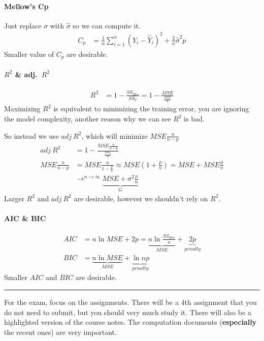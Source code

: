 \documentclass[12 pt]{article}
\begin{document}
  \paragraph{Mellow's Cp} Just replace $\sigma$ with $\hat{\sigma}$ so we can compute it.
  \begin{align*}
    C_p & = \frac{1}{n} \sum_{i=1}^n (Y_i - \hat{Y}_i)^2 + \frac{2}{n} \hat{\sigma}^2 p
  \end{align*}
  Smaller value of $C_p$ are desirable.
  \paragraph{$R^2$ \& adj.\ $R^2$}
  \begin{align*}
    R^2 & = 1 - \frac{SS_{Res}}{SS_T} = 1 - \frac{MSE}{\frac{SST}{n}}
  \end{align*}
  Maximizing $R^2$ is equivalent to minimizing the training error, you are ignoring the model complexity, another reason why we can see $R^2$ is bad.

  So instead we use $adj\ R^2$, which will minimize $MSE \frac{n}{n-p}$
  \begin{align*}
    adj\ R^2 & = 1 - \frac{MSE \frac{n}{n-p}}{\frac{SS_T}{n}}
    \\ MSE \frac{n}{n-p} & = MSE \frac{n}{1 - \frac{p}{n}} \approx MSE \left(1 + \frac{p}{n}\right) = MSE + MSE \frac{p}{n}
                           \\ & \to^{n \to \infty} \underbrace{MSE + \sigma^2 \frac{p}{n}}_{G}
  \end{align*}
  Larger $R^2$ and $adj\ R^2$ are desirable, however we shouldn't rely on $R^2$.
  \paragraph{AIC \& BIC}
  \begin{align*}
    AIC & = n \ln MSE + 2 p = \underbrace{n \ln \frac{SS_{Res}}{n}}_{MSE} + \underbrace{2p}_{penalty}
    \\ BIC & = \underbrace{n \ln MSE}_{MSE} + \underbrace{\ln n p}_{penalty}
  \end{align*}
  Smaller $AIC$ and $BIC$ are desirable.  \\ \noindent
  \rule{\textwidth}{0.5pt}
  For the exam, focus on the
  assignments. There will be a 4th assignment that you do not need to
  submit, but you should very much study it. There will also be a
  highlighted version of the course notes. The computation documents
  (\textbf{especially} the recent ones) are very important.
\end{document}
